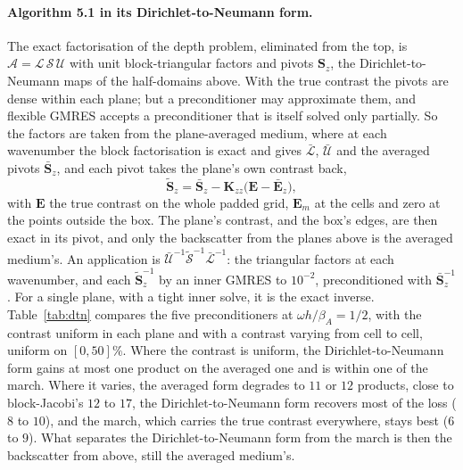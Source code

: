 \documentclass[11pt,a4paper]{article}
\newcommand{\bK}{\mathbf{K}}
\begin{document}
\paragraph{Algorithm 5.1 in its Dirichlet-to-Neumann form.} The exact factorisation of the depth problem,
eliminated from the top, is $\mathcal A=\mathcal L\,\mathcal S\,\mathcal U$ with unit block-triangular factors
and pivots $\mathbf S_z$, the Dirichlet-to-Neumann maps of the half-domains above. With the true contrast the
pivots are dense within each plane; but a preconditioner may approximate them, and flexible GMRES accepts a
preconditioner that is itself solved only partially. So the factors are taken from the plane-averaged medium,
where at each wavenumber the block factorisation is exact and gives $\bar{\mathcal L}$, $\bar{\mathcal U}$ and the
averaged pivots $\bar{\mathbf S}_z$, and each pivot takes the plane's own contrast back,
\begin{equation}\label{eq:dtnpivot}
  \tilde{\mathbf S}_z=\bar{\mathbf S}_z-\bK_{zz}\bigl(\mathbf E-\bar{\mathbf E}_z\bigr),
\end{equation}
with $\mathbf E$ the true contrast on the whole padded grid, $\mathbf E_m$ at the cells and zero at the points
outside the box. The plane's contrast, and the box's edges, are then exact in its pivot, and only the backscatter
from the planes above is the averaged medium's. An application is
$\bar{\mathcal U}^{-1}\tilde{\mathcal S}^{-1}\bar{\mathcal L}^{-1}$: the triangular factors at each wavenumber,
and each $\tilde{\mathbf S}_z^{-1}$ by an inner GMRES to $10^{-2}$, preconditioned with $\bar{\mathbf S}_z^{-1}$.
For a single plane, with a tight inner solve, it is the exact inverse. Table~\ref{tab:dtn} compares the five
preconditioners at $\omega h/\beta_A=1/2$, with the contrast uniform in each plane and with a contrast varying
from cell to cell, uniform on $[0,50]\%$. Where the contrast is uniform, the Dirichlet-to-Neumann form gains at
most one product on the averaged one and is within one of the march. Where it varies, the averaged form degrades to $11$ or
$12$ products, close to block-Jacobi's $12$ to $17$, the Dirichlet-to-Neumann form recovers most of the loss
($8$ to $10$), and the march, which carries the true contrast everywhere, stays best ($6$ to $9$). What separates
the Dirichlet-to-Neumann form from the march is then the backscatter from above, still the averaged medium's.
\end{document}
